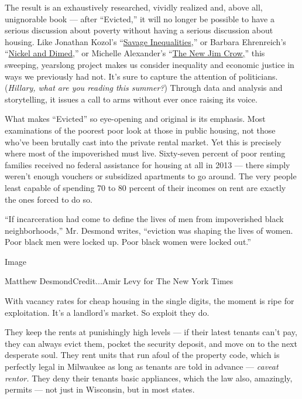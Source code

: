 The result is an exhaustively researched, vividly realized and, above
all, unignorable book --- after ``Evicted,'' it will no longer be
possible to have a serious discussion about poverty without having a
serious discussion about housing. Like Jonathan Kozol's
``\href{http://www.nytimes3xbfgragh.onion/1991/09/25/books/books-of-the-times-shortchanging-the-nation-s-children.html}{Savage
Inequalities},'' or Barbara Ehrenreich's
``\href{http://barbaraehrenreich.com/nickel-and-dimed-by-barbara-ehrenreich/}{Nickel
and Dimed},'' or Michelle Alexander's
``\href{http://newjimcrow.com/praise-for-the-new-jim-crow}{The New Jim
Crow,}'' this sweeping, yearslong project makes us consider inequality
and economic justice in ways we previously had not. It's sure to capture
the attention of politicians. (\emph{Hillary, what are you reading this
summer?}) Through data and analysis and storytelling, it issues a call
to arms without ever once raising its voice.

What makes ``Evicted'' so eye-opening and original is its emphasis. Most
examinations of the poorest poor look at those in public housing, not
those who've been brutally cast into the private rental market. Yet this
is precisely where most of the impoverished must live. Sixty-seven
percent of poor renting families received no federal assistance for
housing at all in 2013 --- there simply weren't enough vouchers or
subsidized apartments to go around. The very people least capable of
spending 70 to 80 percent of their incomes on rent are exactly the ones
forced to do so.

``If incarceration had come to define the lives of men from impoverished
black neighborhoods,'' Mr. Desmond writes, ``eviction was shaping the
lives of women. Poor black men were locked up. Poor black women were
locked out.''

Image

Matthew DesmondCredit...Amir Levy for The New York Times

With vacancy rates for cheap housing in the single digits, the moment is
ripe for exploitation. It's a landlord's market. So exploit they do.

They keep the rents at punishingly high levels --- if their latest
tenants can't pay, they can always evict them, pocket the security
deposit, and move on to the next desperate soul. They rent units that
run afoul of the property code, which is perfectly legal in Milwaukee as
long as tenants are told in advance --- \emph{caveat rentor.} They deny
their tenants basic appliances, which the law also, amazingly, permits
--- not just in Wisconsin, but in most states.

